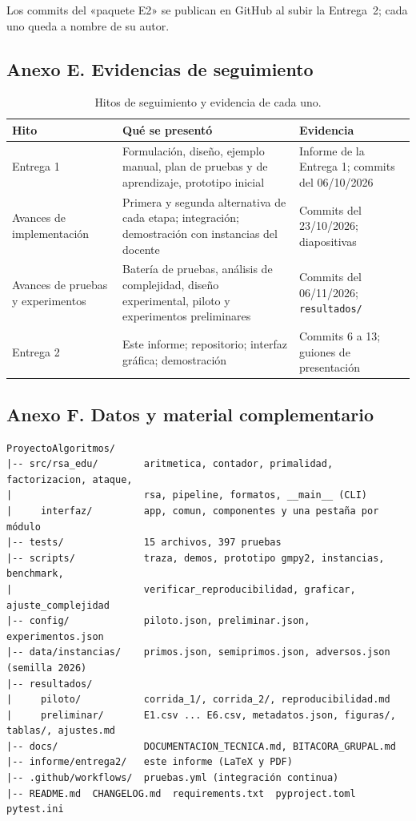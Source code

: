 \noindent Los commits del «paquete E2» se publican en GitHub al subir la Entrega~2;
cada uno queda a nombre de su autor.

\subsection{Anexo E. Evidencias de seguimiento}
\label{anx:seguimiento}

\begin{table}[H]
\centering\small
\caption{Hitos de seguimiento y evidencia de cada uno.}
\begin{tabularx}{\linewidth}{@{}R{2.8cm} Y Y@{}}
\toprule
\textbf{Hito} & \textbf{Qué se presentó} & \textbf{Evidencia}\\
\midrule
Entrega 1 & Formulación, diseño, ejemplo manual, plan de pruebas y de aprendizaje, prototipo inicial & Informe de la Entrega 1; commits del 06/10/2026\\
Avances de implementación & Primera y segunda alternativa de cada etapa; integración; demostración con instancias del docente & Commits del 23/10/2026; diapositivas\\
Avances de pruebas y experimentos & Batería de pruebas, análisis de complejidad, diseño experimental, piloto y experimentos preliminares & Commits del 06/11/2026; \texttt{resultados/}\\
Entrega 2 & Este informe; repositorio; interfaz gráfica; demostración & Commits 6 a 13; guiones de presentación\\
\bottomrule
\end{tabularx}
\end{table}

\subsection{Anexo F. Datos y material complementario}
\label{anx:datos}

\begin{lstlisting}[style=datos, caption={Organización del repositorio (Entrega 2).}]
ProyectoAlgoritmos/
|-- src/rsa_edu/        aritmetica, contador, primalidad, factorizacion, ataque,
|                       rsa, pipeline, formatos, __main__ (CLI)
|     interfaz/         app, comun, componentes y una pestaña por módulo
|-- tests/              15 archivos, 397 pruebas
|-- scripts/            traza, demos, prototipo gmpy2, instancias, benchmark,
|                       verificar_reproducibilidad, graficar, ajuste_complejidad
|-- config/             piloto.json, preliminar.json, experimentos.json
|-- data/instancias/    primos.json, semiprimos.json, adversos.json (semilla 2026)
|-- resultados/
|     piloto/           corrida_1/, corrida_2/, reproducibilidad.md
|     preliminar/       E1.csv ... E6.csv, metadatos.json, figuras/, tablas/, ajustes.md
|-- docs/               DOCUMENTACION_TECNICA.md, BITACORA_GRUPAL.md
|-- informe/entrega2/   este informe (LaTeX y PDF)
|-- .github/workflows/  pruebas.yml (integración continua)
|-- README.md  CHANGELOG.md  requirements.txt  pyproject.toml  pytest.ini
\end{lstlisting}



